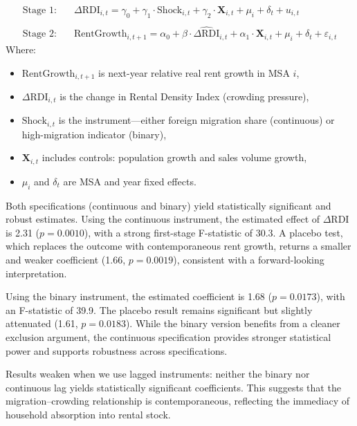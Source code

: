 \documentclass[APA,Times1COL]{WileyNJDv5} %
\begin{document}
\begin{align*}
	\text{Stage 1:} \quad & \Delta \text{RDI}_{i,t} = \gamma_0 + \gamma_1 \cdot \text{Shock}_{i,t} + \gamma_2 \cdot \mathbf{X}_{i,t} + \mu_i + \delta_t + u_{i,t} \\\\
	\text{Stage 2:} \quad & \text{RentGrowth}_{i,t+1} = \alpha_0 + \beta \cdot \widehat{\Delta \text{RDI}}_{i,t} + \alpha_1 \cdot \mathbf{X}_{i,t} + \mu_i + \delta_t + \varepsilon_{i,t}
\end{align*}
Where:
\begin{itemize}
	\item $\text{RentGrowth}_{i,t+1}$ is next-year relative real rent growth in MSA $i$,
	\item $\Delta \text{RDI}_{i,t}$ is the change in Rental Density Index (crowding pressure),
	\item $\text{Shock}_{i,t}$ is the instrument—either foreign migration share (continuous) or high-migration indicator (binary),
	\item $\mathbf{X}_{i,t}$ includes controls: population growth and sales volume growth,
	\item $\mu_i$ and $\delta_t$ are MSA and year fixed effects.
\end{itemize}


Both specifications (continuous and binary) yield statistically significant and robust estimates. Using the continuous instrument, the estimated effect of \(\Delta \text{RDI}\) is 2.31 (\(p = 0.0010\)), with a strong first-stage F-statistic of 30.3. A placebo test, which replaces the outcome with contemporaneous rent growth, returns a smaller and weaker coefficient (1.66, \(p = 0.0019\)), consistent with a forward-looking interpretation.

Using the binary instrument, the estimated coefficient is 1.68 (\(p = 0.0173\)), with an F-statistic of 39.9. The placebo result remains significant but slightly attenuated (1.61, \(p = 0.0183\)). While the binary version benefits from a cleaner exclusion argument, the continuous specification provides stronger statistical power and supports robustness across specifications.

Results weaken when we use lagged instruments: neither the binary nor continuous lag yields statistically significant coefficients. This suggests that the migration–crowding relationship is contemporaneous, reflecting the immediacy of household absorption into rental stock.
\end{document}
